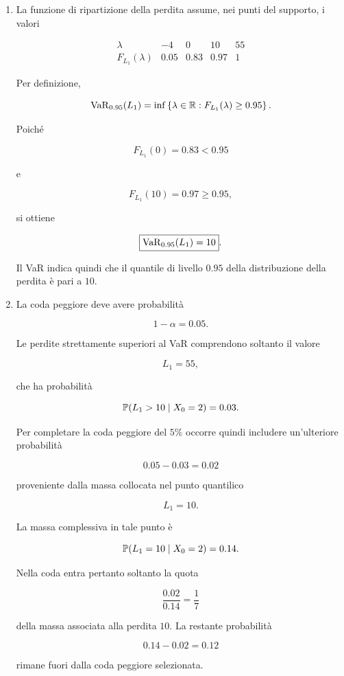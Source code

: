\begin{enumerate}

\item La funzione di ripartizione della perdita assume, nei punti del
supporto, i valori

\[
\begin{array}{c|cccc}
\lambda
&
-4
&
0
&
10
&
55
\\
\hline
F_{L_1}(\lambda)
&
0.05
&
0.83
&
0.97
&
1
\end{array}
\]

Per definizione,

\[
\operatorname{VaR}_{0.95}(L_1)
=
\inf
\left\{
\lambda\in\mathbb{R}:
F_{L_1}(\lambda)\geq0.95
\right\}.
\]

Poich\'{e}

\[
F_{L_1}(0)=0.83<0.95
\]

e

\[
F_{L_1}(10)=0.97\geq0.95,
\]

si ottiene

\[
\boxed{
\operatorname{VaR}_{0.95}(L_1)=10
}.
\]

Il VaR indica quindi che il quantile di livello $0.95$ della
distribuzione della perdita \`{e} pari a $10$.

\item La coda peggiore deve avere probabilit\`{a}

\[
1-\alpha=0.05.
\]

Le perdite strettamente superiori al VaR comprendono soltanto il valore

\[
L_1=55,
\]

che ha probabilit\`{a}

\[
\mathbb{P}(L_1>10\mid X_0=2)=0.03.
\]

Per completare la coda peggiore del $5\%$ occorre quindi includere
un'ulteriore probabilit\`{a}

\[
0.05-0.03=0.02
\]

proveniente dalla massa collocata nel punto quantilico

\[
L_1=10.
\]

La massa complessiva in tale punto \`{e}

\[
\mathbb{P}(L_1=10\mid X_0=2)=0.14.
\]

Nella coda entra pertanto soltanto la quota

\[
\frac{0.02}{0.14}
=
\frac{1}{7}
\]

della massa associata alla perdita $10$. La restante probabilit\`{a}

\[
0.14-0.02=0.12
\]

rimane fuori dalla coda peggiore selezionata.


\end{enumerate}

